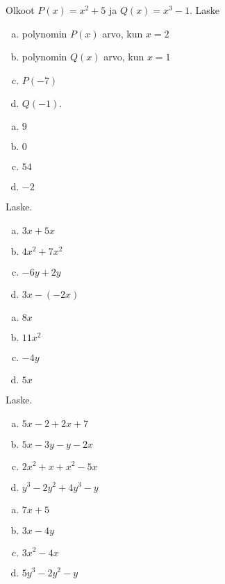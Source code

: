 \begin{tehtavasivu}
\begin{tehtava}
    Olkoot $P(x)=x^2+5$ ja $Q(x)=x^3-1$. Laske
    \begin{enumerate}[a)]
        \item polynomin $P(x)$ arvo, kun $x=2$
        \item polynomin $Q(x)$ arvo, kun $x=1$
        \item $P(-7)$
        \item $Q(-1)$.
    \end{enumerate}
    \begin{vastaus}
        \begin{enumerate}[a)]
            \item $9$ %
            \item $0$ %
            \item $54$ %
            \item $-2$ %
        \end{enumerate}
    \end{vastaus}
\end{tehtava}

\begin{tehtava}
    Laske.
    \begin{enumerate}[a)]
        \item $3x+5x $
        \item $4x^2+7x^2$
        \item $-6y+2y $
        \item $3x-(-2x)$
    \end{enumerate}
    \begin{vastaus}
        \begin{enumerate}[a)]
            \item $8x$
            \item $11x^2$
            \item $-4y$
            \item $5x$
        \end{enumerate}
    \end{vastaus}
\end{tehtava}

\begin{tehtava}
    Laske.
    \begin{enumerate}[a)]
    	\item $5x-2+2x+7$
        \item $5x-3y-y-2x$
        \item $2x^2+x+x^2-5x$
        \item $y^3 - 2y^2+4y^3-y $
    \end{enumerate}
    \begin{vastaus}
        \begin{enumerate}[a)]
        	\item $7x+5$
            \item $3x-4y$
            \item $3x^2-4x$
            \item $5y^3-2y^2-y$
        \end{enumerate}
    \end{vastaus}
\end{tehtava}


\end{tehtavasivu}
